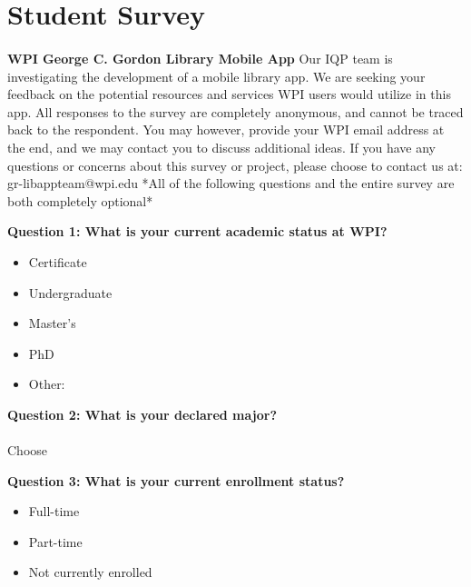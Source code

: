 \section{Student Survey}

\paragraph{}
\noindent\textbf{WPI George C. Gordon Library Mobile App}
\newline
\noindent Our IQP team is investigating the development of a mobile library app. We are seeking your feedback on the potential resources and services WPI users would utilize in this app.
All responses to the survey are completely anonymous, and cannot be traced back to the respondent. You may however, provide your WPI email address at the end, and we may contact you to discuss additional ideas. 
If you have any questions or concerns about this survey or project, please choose to contact us at:
gr-libappteam@wpi.edu
*All of the following questions and the entire survey are both completely optional*
\newline


\noindent\textbf{Question 1: What is your current academic status at WPI?}
\begin{itemize}
    \item Certificate
    \item Undergraduate
    \item Master's
    \item PhD
    \item Other:
\end{itemize}
\newline


\noindent\textbf{Question 2: What is your declared major?}
\paragraph{}
Choose
\newline


\noindent\textbf{Question 3: What is your current enrollment status?}
\begin{itemize}
    \item Full-time
    \item Part-time
    \item Not currently enrolled
\end{itemize}
\newline


